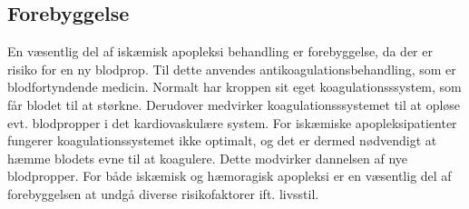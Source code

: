 \subsection{Forebyggelse}
En væsentlig del af iskæmisk apopleksi behandling er forebyggelse, da der er risiko for en ny blodprop. Til dette anvendes antikoagulationsbehandling, som er blodfortyndende medicin. Normalt har kroppen sit eget koagulationsssystem, som får blodet til at størkne. Derudover medvirker koagulationsssystemet til at opløse evt. blodpropper i det kardiovaskulære system. For iskæmiske apopleksipatienter fungerer koagulationssystemet ikke optimalt, og det er dermed nødvendigt at hæmme blodets evne til at koagulere. Dette modvirker dannelsen af nye blodpropper. \cite{Kjaergaard2015}
For både iskæmisk og hæmoragisk apopleksi er en væsentlig del af forebyggelsen at undgå diverse risikofaktorer ift. livsstil. \cite{Christensen2015}



